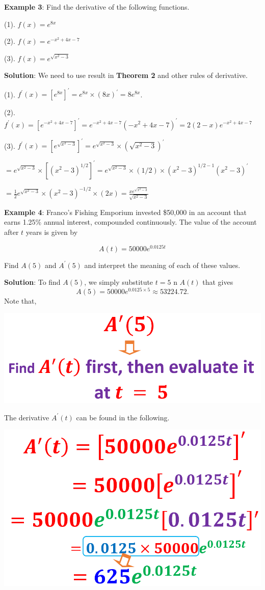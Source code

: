\documentclass[
]{book}
\begin{document}
\hfill\break
\textbf{Example 3}: Find the derivative of the following functions.

(1). \(f(x) = e^{8x}\)

(2). \(f(x) = e^{-x^2 + 4x -7}\)

(3). \(f(x) = e^{\sqrt{x^2-3}}\)

\textbf{Solution}: We need to use result in \textbf{Theorem 2} and other rules of derivative.

(1). \(f^\prime(x) = [e^{8x}]^\prime = e^{8x}\times (8x)^\prime = 8e^{8x}\).

(2). \(f^\prime(x) = [e^{-x^2 + 4x -7}]^\prime = e^{-x^2 + 4x -7}(-x^2 + 4x -7)^\prime = 2(2-x)e^{-x^2 + 4x -7}\)

(3). \(f^\prime(x) = [e^{\sqrt{x^2-3}}]^\prime = e^{\sqrt{x^2-3}}\times(\sqrt{x^2-3})^\prime\)

\(=e^{\sqrt{x^2-3}}\times [(x^2-3)^{1/2}]^\prime =e^{\sqrt{x^2-3}}\times (1/2)\times (x^2-3)^{1/2-1}(x^2-3)^\prime\)

\(=\frac{1}{2}e^{\sqrt{x^2-3}}\times (x^2-3)^{-1/2}\times(2x) = \frac{xe^{\sqrt{x^2-3}}}{\sqrt{x^2-3}}\)

\textbf{Example 4}: Franco's Fishing Emporium invested \$50,000 in an account that earns 1.25\% annual interest, compounded continuously. The value of the account after \(t\) years is given by

\[
A(t) = 50000e^{0.0125t}
\]

Find \(A(5)\) and \(A^\prime(5)\) and interpret the meaning of each of these values.

\textbf{Solution}: To find \(A(5)\), we simply substitute \(t = 5\) n \(A(t)\) that gives
\[
A(5) = 50000e^{0.0125\times 5} \approx 53224.72.
\]
Note that,

\begin{center}\includegraphics[width=0.7\linewidth]{img05/w05-EvaluateDerivative} \end{center}

The derivative \(A^\prime(t)\) can be found in the following.

\begin{center}\includegraphics[width=0.7\linewidth]{img05/w05-BalanceFunDerivative} \end{center}
\end{document}
